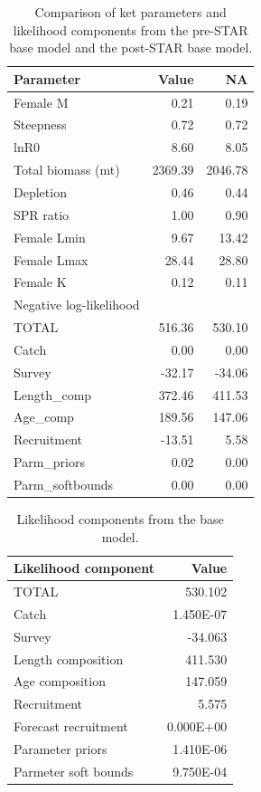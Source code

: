 \documentclass[12pt,]{article}
\begin{document}
\FloatBarrier

\begin{table}[ht]
\centering
\caption{Comparison of ket parameters and likelihood 
                                            components from the pre-STAR base model and the 
                                            post-STAR base model.} 
\label{tab:preSTAR_postSTAR_compare}
\begin{tabular}{lrr}
  \hline
Parameter & Value & NA \\ 
  \hline
Female M & 0.21 & 0.19 \\ 
  Steepness & 0.72 & 0.72 \\ 
  lnR0 & 8.60 & 8.05 \\ 
  Total biomass (mt) & 2369.39 & 2046.78 \\ 
  Depletion & 0.46 & 0.44 \\ 
  SPR ratio & 1.00 & 0.90 \\ 
  Female Lmin & 9.67 & 13.42 \\ 
  Female Lmax & 28.44 & 28.80 \\ 
  Female K & 0.12 & 0.11 \\ 
  Negative log-likelihood &  &  \\ 
  TOTAL & 516.36 & 530.10 \\ 
  Catch & 0.00 & 0.00 \\ 
  Survey & -32.17 & -34.06 \\ 
  Length\_comp & 372.46 & 411.53 \\ 
  Age\_comp & 189.56 & 147.06 \\ 
  Recruitment & -13.51 & 5.58 \\ 
  Parm\_priors & 0.02 & 0.00 \\ 
  Parm\_softbounds & 0.00 & 0.00 \\ 
   \hline
\end{tabular}
\end{table}

\FloatBarrier

\newpage

\begin{table}[ht]
\centering
\caption{Likelihood components from the base model.} 
\label{tab:like_components}
\begin{tabular}{lr}
  \hline
Likelihood component & Value \\ 
  \hline
TOTAL & 530.102 \\ 
  Catch & 1.450E-07 \\ 
  Survey & -34.063 \\ 
  Length composition & 411.530 \\ 
  Age composition & 147.059 \\ 
  Recruitment & 5.575 \\ 
  Forecast recruitment & 0.000E+00 \\ 
  Parameter priors & 1.410E-06 \\ 
  Parmeter soft bounds & 9.750E-04 \\ 
   \hline
\end{tabular}
\end{table}
\end{document}
